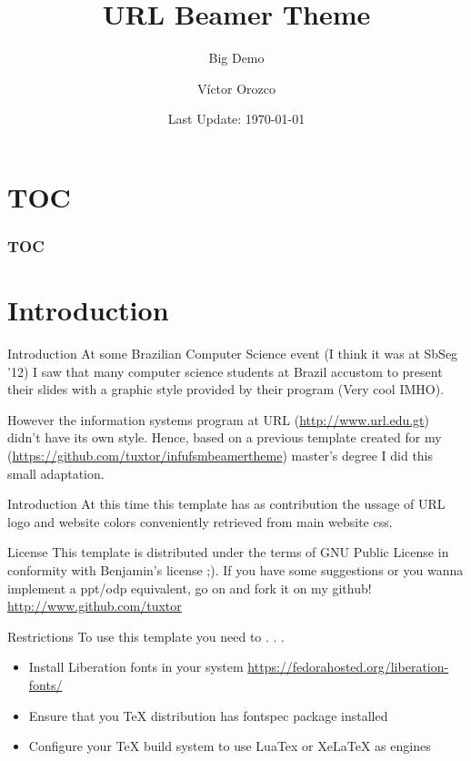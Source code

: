 \documentclass{beamer}
\title{URL Beamer Theme}
\subtitle{Big Demo}
\date{Last Update: \today}
\author{Víctor Orozco}
\institute{{\Medium Ingeniería} URL}
\begin{document}
\maketitle

\section*{TOC}
\begin{frame}
	\frametitle{TOC}
	\tableofcontents[hideallsubsections]
\end{frame}

\section{Introduction}

\begin{frame}{Introduction}
	At some Brazilian Computer Science event (I think it was at SbSeg '12) I saw that many computer science students at Brazil accustom to present their slides with a graphic style provided by their program (Very cool IMHO).
	
	However the information systems program at URL (\url{http://www.url.edu.gt}) didn't have its own style. Hence, based on a previous template created for my (\url{https://github.com/tuxtor/infufsmbeamertheme}) master's degree I did this small adaptation.
\end{frame}

\begin{frame}{Introduction}
	At this time this template has as contribution the ussage of URL logo and website colors conveniently retrieved from main website css.
\end{frame}

\begin{frame}{License}
	This template is distributed under the terms of GNU Public License in conformity with Benjamin's license ;). If you have some suggestions or you wanna implement a ppt/odp equivalent, go on and fork it on my github! \url{http://www.github.com/tuxtor}
\end{frame}

\begin{frame}{Restrictions}
	To use this template you need to . . .
	\begin{itemize}
		\item Install Liberation fonts in your system \url{https://fedorahosted.org/liberation-fonts/}
		\item Ensure that you TeX distribution has fontspec package installed
		\item Configure your TeX build system to use LuaTex or XeLaTeX as engines
	\end{itemize}
\end{frame}
\end{document}
